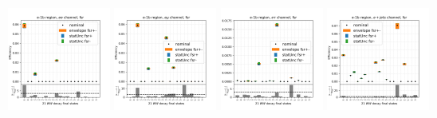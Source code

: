 \begin{figure}
    \includegraphics[width=0.24\textwidth]{appendices/ttSystReweighting/figures/afterCorr/icata2_ch0_fsr.png}
    \includegraphics[width=0.24\textwidth]{appendices/ttSystReweighting/figures/afterCorr/icata2_ch1_fsr.png}
    \includegraphics[width=0.24\textwidth]{appendices/ttSystReweighting/figures/afterCorr/icata2_ch2_fsr.png}
    \includegraphics[width=0.24\textwidth]{appendices/ttSystReweighting/figures/afterCorr/icata2_ch3_fsr.png}


\end{figure}
